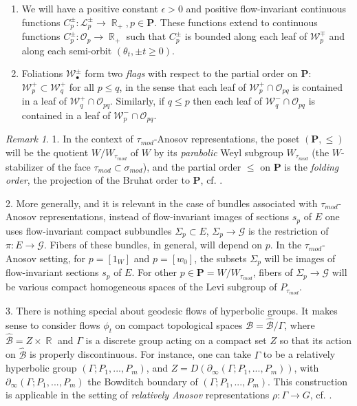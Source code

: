 \documentclass[12pt]{amsbook}%
\theoremstyle{definition}
\theoremstyle{remark}
\newtheorem{rem}[thm]{Remark}
\numberwithin{section}{chapter}
\numberwithin{subsection}{section}
\numberwithin{figure}{chapter}
\DeclareMathOperator{\R}{\mathbb{R}}
\def\eps{\epsilon}
\def\taumod{\tau_{mod}}
\def\simod{\sigma_{mod}}
\def\cB{{\mathscr{B}}}
\def\cO{{\mathscr{O}}}
\def\cW{{\mathscr{W}}}
\def\PP{{\mathbf{P}}}
\def\Ga{\Gamma}
\def\geo{\partial_\infty}
\def\cG{{\mathscr{G}}}
\def\cL{{\mathscr{L}}}
\def\mini{\scriptsize}
\begin{document}
{{\begin{enumerate}
\item We will have a positive constant $\eps>0$ and positive flow-invariant continuous functions $C_p^\pm: \cL^\pm_p\to \R_+, p\in \PP$. These functions 
extend to continuous functions $C_p^\pm: \cO_p\to \R_+$ such that $C_p^\pm$ is bounded %
along each leaf of $\cW_p^\mp$ and along each semi-orbit $(\theta_t, \pm t\geqslant 0)$.  

\item Foliations $\cW^\pm_{\bullet}$ form two {\em flags} with respect  to the partial order on $\PP$:  
$\cW^+_p\subset \cW^+_q$ for all $p\le q$, in the sense that  each leaf of $\cW^+_{p}\cap \cO_{pq}$ 
is contained in a leaf of $\cW^+_{q}\cap \cO_{pq}$. 
Similarly, if $q\le p$ then each  leaf of $\cW^-_{q}\cap \cO_{pq}$ is 
contained in a leaf of $\cW^-_{p}\cap \cO_{pq}$. 
\end{enumerate}

\begin{rem}
1. In the context of $\taumod$-Anosov representations, the poset $(\PP,\le)$ will be the quotient $W/W_{\taumod}$ of $W$ by its {\em parabolic} Weyl subgroup 
$W_{\taumod}$ (the $W$-stabilizer of the face $\taumod\subset \simod$), and the partial order $\le$ on $\PP$ is the {\em folding order}, the 
projection of the Bruhat order to $\PP$, cf. \cite{manicures, KLP18A}.  

2. More generally, and it is relevant in the case of bundles associated with $\taumod$-Anosov representations, instead of flow-invariant images 
of sections $s_p$ of $E$  one uses flow-invariant compact subbundles $\Sigma_p\subset E$, $\Sigma_p\to \cG$ is the restriction of $\pi: E\to \cG$. 
Fibers of these bundles, in general, will depend on $p$. In the $\taumod$-Anosov setting, 
for $p=[1_W]$ and $p=[w_0]$, the subsets $\Sigma_p$ will be images of flow-invariant sections $s_p$ of $E$. For other $p\in \PP=W/W_{\taumod}$, 
fibers of $\Sigma_p\to \cG$ will be various compact homogeneous spaces  of the Levi subgroup of 
$P_{\taumod}$. 

3. There is nothing special about geodesic flows of hyperbolic groups. It makes sense to consider flows $\phi_t$ on compact topological spaces $\cB=\widehat\cB/\Ga$, where $\widehat\cB= Z\times \R$ and $\Ga$ is a discrete group acting on a compact set $Z$ so that its action 
on $\widehat\cB$ is properly discontinuous. For instance, one can take $\Ga$ to be a relatively hyperbolic group $(\Ga; P_1,...,P_m)$, 
and $Z=D(\geo(\Ga; P_1,...,P_m))$, with $\geo(\Ga; P_1,...,P_m)$ the Bowditch boundary of $(\Ga; P_1,...,P_m)$. This construction is applicable in the setting of {\em relatively Anosov} representations $\rho: \Ga\to G$, cf. \cite{MR4622401, MR4760445}. 


\end{rem}}}
\end{document}
